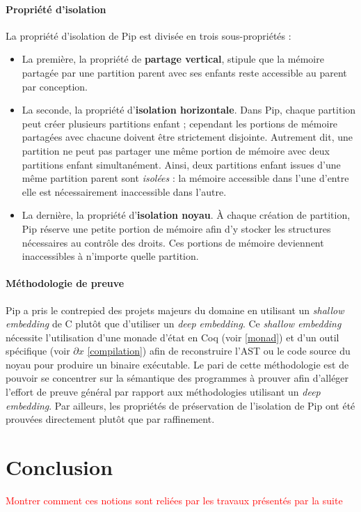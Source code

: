 	\paragraph{Propriété d'isolation} La propriété d'isolation de Pip est divisée en trois sous-propriétés :
	\begin{itemize}
		\item La première, la propriété de \textbf{partage vertical}, stipule que la mémoire partagée par une partition parent avec ses enfants reste accessible au parent par conception.

		\item La seconde, la propriété d'\textbf{isolation horizontale}. Dans Pip, chaque partition peut créer plusieurs partitions enfant ; cependant les portions de mémoire partagées avec chacune doivent être strictement disjointe. Autrement dit, une partition ne peut pas partager une même portion de mémoire avec deux partitions enfant simultanément. Ainsi, deux partitions enfant issues d'une même partition parent sont \emph{isolées} : la mémoire accessible dans l'une d'entre elle est nécessairement inaccessible dans l'autre.

		\item La dernière, la propriété d'\textbf{isolation noyau}. À chaque création de partition, Pip réserve une petite portion de mémoire afin d'y stocker les structures nécessaires au contrôle des droits. Ces portions de mémoire deviennent inaccessibles à n'importe quelle partition.
	\end{itemize}


	\paragraph{Méthodologie de preuve} Pip a pris le contrepied des projets majeurs du domaine en utilisant un \emph{shallow embedding} de C plutôt que d'utiliser un \emph{deep embedding}. Ce \emph{shallow embedding} nécessite l'utilisation d'une monade d'état en Coq (voir \ref{monad}) et d'un outil spécifique (voir $\partial x$ \ref{compilation}) afin de reconstruire l'AST ou le code source du noyau pour produire un binaire exécutable.
	Le pari de cette méthodologie est de pouvoir se concentrer sur la sémantique des programmes à prouver afin d'alléger l'effort de preuve général par rapport aux méthodologies utilisant un \emph{deep embedding}. Par ailleurs, les propriétés de préservation de l'isolation de Pip ont été prouvées directement plutôt que par raffinement.

	\section{Conclusion}

	\textcolor{red}{Montrer comment ces notions sont reliées par les travaux présentés par la suite}
